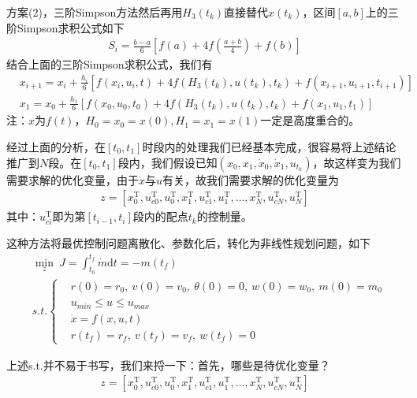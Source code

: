             方案(2)，三阶Simpson方法然后再用$H_3(t_k)$直接替代$x(t_k)$，区间$[a,b]$上的三阶Simpson求积公式如下
            \begin{align*}
            S_i = \frac{b-a}{6}[f(a)+4f(\frac{a+b}{4})+f(b)]
            \end{align*}
            结合上面的三阶Simpson求积公式，我们有
            \begin{align*}
            & x_{i+1} = x_i + \frac{h_i}{6}[f(x_i,u_i,t)+4f(H_3(t_k),u(t_k),t_k)+f(x_{i+1},u_{i+1},t_{i+1})]\\
            & x_1 = x_0 + \frac{h_1}{6}[f(x_0,u_0,t_0)+4f(H_3(t_k),u(t_k),t_k)+f(x_{1},u_{1},t_{1})]
            \end{align*}
            注：$x$为$f(t)$，$H_0 = x_0 = x(0),H_1=x_1=x(1)$一定是高度重合的。
            \par
            经过上面的分析，在$[t_0,t_1]$时段内的处理我们已经基本完成，很容易将上述结论推广到$N$段。在$[t_0,t_1]$段内，我们假设已知$(x_0,x_1,\dot{x}_0,\dot{x}_1,u_{t_k})$，故这样变为我们需要求解的优化变量，由于$\dot{x}$与$u$有关，故我们需要求解的优化变量为
            \begin{align*}
            z = [x_0^\mathrm{T},u_{c0}^\mathrm{T},u_0^\mathrm{T},x_1^\mathrm{T},u_{c1}^\mathrm{T},u_1^\mathrm{T},\dots,x_N^\mathrm{T},u_{cN}^\mathrm{T},u_N^\mathrm{T}]
            \end{align*}
            其中：$u_{ci}^\mathrm{T}$即为第$[t_{i-1},t_i]$段内的配点$t_k$的控制量。
            \par
            这种方法将最优控制问题离散化、参数化后，转化为非线性规划问题，如下
            \begin{align*}
            & \min_z \ J = \int_{t_0}^{t_f}\dot{m}\mathrm{d}t = -m(t_f)\\
            & s.t.\left\{
            \begin{aligned}
            & r(0) = r_0,\ v(0) = v_0,\ \theta(0) = 0,\ w(0) = w_0,\ m(0) = m_0\\
            & u_{min} \leqslant u \leqslant u_{max}\\
            & \dot{x} = f(x,u,t)\\
            & r(t_f)=r_f,\ v(t_f) = v_f,\ w(t_f) = 0
            \end{aligned}
            \right.
            \end{align*}
            \par
            上述s.t.并不易于书写，我们来捋一下：首先，哪些是待优化变量？
            \begin{align*}
            z = [x_0^\mathrm{T},u_{c0}^\mathrm{T},u_0^\mathrm{T},x_1^\mathrm{T},u_{c1}^\mathrm{T},u_1^\mathrm{T},\dots,x_N^\mathrm{T},u_{cN}^\mathrm{T},u_N^\mathrm{T}]
            \end{align*}
